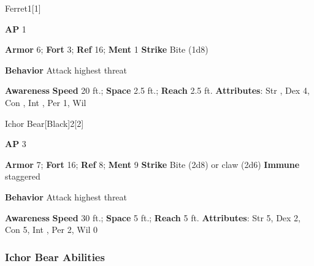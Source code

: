 \begin{monsection}{Ferret}{1}[1]
\vspace{-1em}\vspace{-1em}
\begin{spellcontent}
\begin{spelltargetinginfo}
{\textbf{AP} 1}

\pari \textbf{Armor} 6;
\textbf{Fort} 3;
\textbf{Ref} 16;
\textbf{Ment} 1
\pari \textbf{Strike} Bite  (1d8)



\pari \textbf{Behavior} Attack highest threat
\end{spelltargetinginfo}
\end{spellcontent}

\begin{monsterfooter}
\pari \textbf{Awareness} 
\pari \textbf{Speed} 20 ft.;
\textbf{Space} 2.5 ft.;
\textbf{Reach} 2.5 ft.
\pari \textbf{Attributes}:
Str ,
Dex 4,
Con ,
Int ,
Per 1,
Wil 
\end{monsterfooter}
\end{monsection}

\begin{monsection}{Ichor Bear}[Black]{2}[2]
\vspace{-1em}\vspace{-1em}
\begin{spellcontent}
\begin{spelltargetinginfo}
{\textbf{AP} 3}

\pari \textbf{Armor} 7;
\textbf{Fort} 16;
\textbf{Ref} 8;
\textbf{Ment} 9
\pari \textbf{Strike} Bite  (2d8) or claw  (2d6)
\pari \textbf{Immune} staggered


\pari \textbf{Behavior} Attack highest threat
\end{spelltargetinginfo}
\end{spellcontent}

\begin{monsterfooter}
\pari \textbf{Awareness} 
\pari \textbf{Speed} 30 ft.;
\textbf{Space} 5 ft.;
\textbf{Reach} 5 ft.
\pari \textbf{Attributes}:
Str 5,
Dex 2,
Con 5,
Int ,
Per 2,
Wil 0
\end{monsterfooter}
\end{monsection}


\subsubsection{Ichor Bear Abilities}

